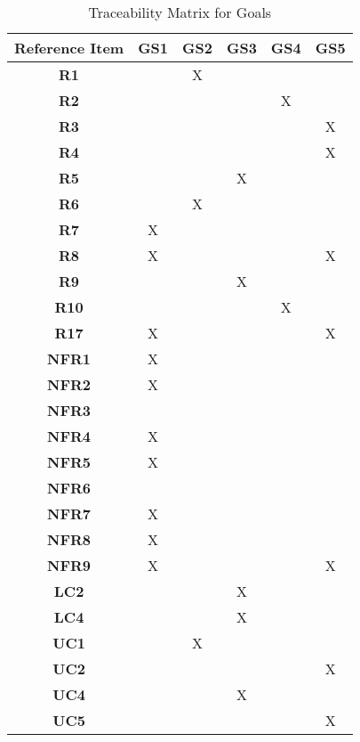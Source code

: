 \begin{table}[ht]
\centering
\begin{tabular}{|c|c|c|c|c|c|}
\hline
\textbf{Reference Item} & \textbf{GS1} & \textbf{GS2} & \textbf{GS3} & \textbf{GS4} & \textbf{GS5} \\ \hline
\textbf{R1} & &X & & & \\ \hline
\textbf{R2} & & & &X & \\ \hline
\textbf{R3} & & & & &X \\ \hline
\textbf{R4} & & & & &X \\ \hline
\textbf{R5} & & &X & & \\ \hline
\textbf{R6} & &X & & & \\ \hline
\textbf{R7} &X & & & & \\ \hline
\textbf{R8} &X & & & &X \\ \hline
\textbf{R9} & & &X & & \\ \hline
\textbf{R10} & & & &X & \\ \hline
\textbf{R17} &X & & & &X \\ \hline
\textbf{NFR1} &X & & & & \\ \hline
\textbf{NFR2} &X & & & & \\ \hline
\textbf{NFR3} & & & & & \\ \hline
\textbf{NFR4} &X & & & & \\ \hline
\textbf{NFR5} &X & & & & \\ \hline
\textbf{NFR6} & & & & & \\ \hline
\textbf{NFR7} &X & & & & \\ \hline
\textbf{NFR8} &X & & & & \\ \hline
\textbf{NFR9} &X & & & &X \\ \hline
\textbf{LC2} & & &X & & \\ \hline
\textbf{LC4} & & &X & & \\ \hline
\textbf{UC1} & &X & & & \\ \hline
\textbf{UC2} & & & & &X \\ \hline
\textbf{UC4} & & &X & & \\ \hline
\textbf{UC5} & & & & &X \\ \hline
\end{tabular}
\caption{Traceability Matrix for Goals}
\label{table:goals_traceability}
\end{table}


